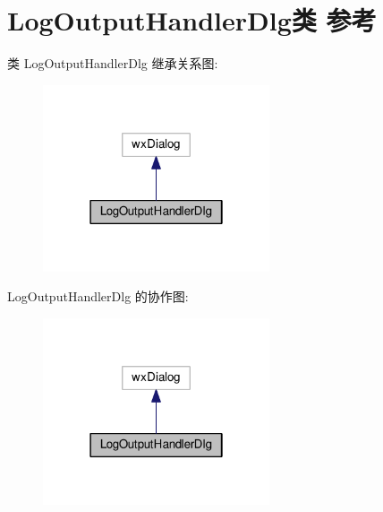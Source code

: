 \hypertarget{class_log_output_handler_dlg}{\section{Log\+Output\+Handler\+Dlg类 参考}
\label{class_log_output_handler_dlg}
}


类 Log\+Output\+Handler\+Dlg 继承关系图\+:
\nopagebreak
\begin{figure}[H]
\begin{center}
\leavevmode
\includegraphics[width=190pt]{class_log_output_handler_dlg__inherit__graph}
\end{center}
\end{figure}


Log\+Output\+Handler\+Dlg 的协作图\+:
\nopagebreak
\begin{figure}[H]
\begin{center}
\leavevmode
\includegraphics[width=190pt]{class_log_output_handler_dlg__coll__graph}
\end{center}
\end{figure}
